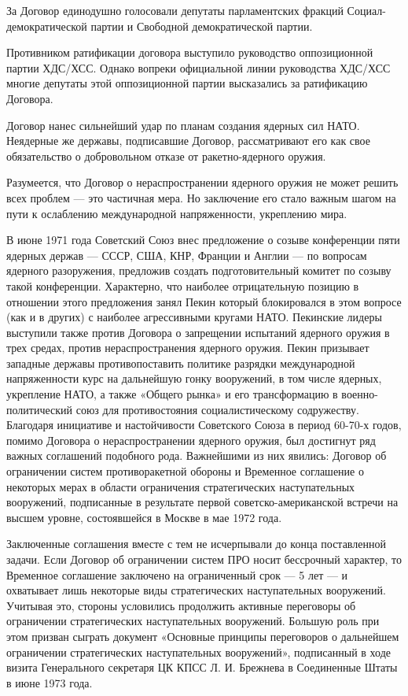 \documentclass[12pt, a4paper, openany]{book}
\begin{document}
	За Договор единодушно голосовали депутаты парламентских фракций Социал-демократической партии и Свободной демократической партии.
	
	Противником ратификации договора выступило руководство оппозиционной партии ХДС/ХСС. Однако вопреки официальной линии руководства ХДС/ХСС многие депутаты этой оппозиционной партии высказались за ратификацию Договора.
	
	Договор нанес сильнейший удар по планам создания ядерных сил НАТО. Неядерные же державы, подписавшие Договор, рассматривают его как свое обязательство о добровольном отказе от ракетно-ядерного оружия.
	
	Разумеется, что Договор о нераспространении ядерного оружия не может решить всех проблем — это частичная мера. Но заключение его стало важным шагом на пути к ослаблению международной напряженности, укреплению мира.
	
	В июне 1971 года Советский Союз внес предложение о созыве конференции пяти ядерных держав — СССР, США, КНР, Франции и Англии — по вопросам ядерного разоружения, предложив создать подготовительный комитет по созыву такой конференции. Характерно, что наиболее отрицательную позицию в отношении этого предложения занял Пекин который блокировался в этом вопросе (как и в других) с наиболее агрессивными кругами НАТО. Пекинские лидеры выступили также против Договора о запрещении испытаний ядерного оружия в трех средах, против нераспространения ядерного оружия. Пекин призывает западные державы противопоставить политике разрядки международной напряженности курс на дальнейшую гонку вооружений, в том числе ядерных, укрепление НАТО, а также «Общего рынка» и его трансформацию в военно-политический союз для противостояния социалистическому содружеству. Благодаря инициативе и настойчивости Советского Союза в период 60-70-х годов, помимо Договора о нераспространении ядерного оружия, был достигнут ряд важных соглашений подобного рода. Важнейшими из них явились: Договор об ограничении систем противоракетной обороны и Временное соглашение о некоторых мерах в области ограничения стратегических наступательных вооружений, подписанные в результате первой советско-американской встречи на высшем уровне, состоявшейся в Москве в мае 1972 года.
	
	Заключенные соглашения вместе с тем не исчерпывали до конца поставленной задачи. Если Договор об ограничении систем ПРО носит бессрочный характер, то Временное соглашение заключено на ограниченный срок — 5 лет — и охватывает лишь некоторые виды стратегических наступательных вооружений. Учитывая это, стороны условились продолжить активные переговоры об ограничении стратегических наступательных вооружений. Большую роль при этом призван сыграть документ «Основные принципы переговоров о дальнейшем ограничении стратегических наступательных вооружений», подписанный в ходе визита Генерального секретаря ЦК КПСС Л. И. Брежнева в Соединенные Штаты в июне 1973 года.
	
\end{document}
